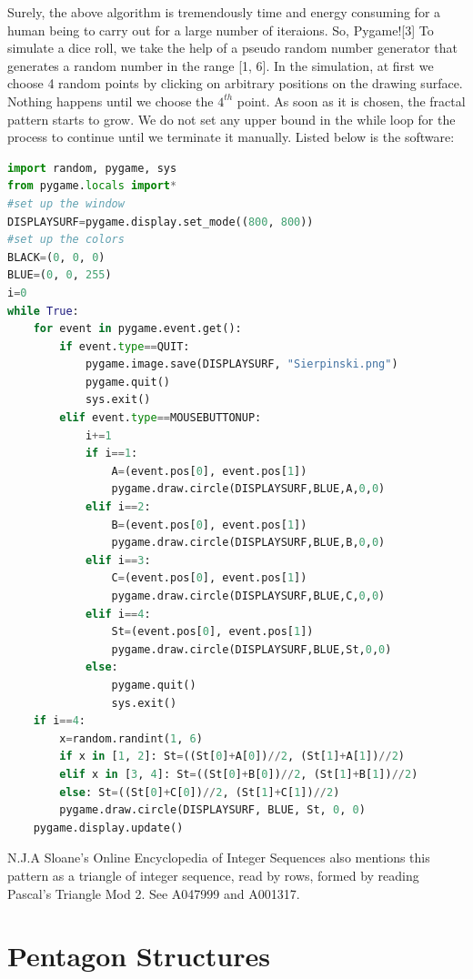 \documentclass{article}
\begin{document}
Surely, the above algorithm is tremendously time and energy consuming for a human being to carry out for a large number of iteraions. So, Pygame![3] To simulate a dice roll, we take the help of a pseudo random number generator that generates a random number in the range [1, 6]. In the simulation, at first we choose 4 random points by clicking on arbitrary positions on the drawing surface. Nothing happens until we choose the $4^{th}$ point. As soon as it is chosen, the fractal pattern starts to grow. We do not set any upper bound in the while loop for the process to continue until we terminate it manually. Listed below is the software:
\begin{lstlisting}[language=Python, frame=single]
import random, pygame, sys
from pygame.locals import*
#set up the window
DISPLAYSURF=pygame.display.set_mode((800, 800))
#set up the colors
BLACK=(0, 0, 0)
BLUE=(0, 0, 255)
i=0
while True:
    for event in pygame.event.get():
        if event.type==QUIT:
            pygame.image.save(DISPLAYSURF, "Sierpinski.png")
            pygame.quit()
            sys.exit()
        elif event.type==MOUSEBUTTONUP:
            i+=1
            if i==1:
                A=(event.pos[0], event.pos[1])
                pygame.draw.circle(DISPLAYSURF,BLUE,A,0,0)
            elif i==2:
                B=(event.pos[0], event.pos[1])
                pygame.draw.circle(DISPLAYSURF,BLUE,B,0,0)
            elif i==3:
                C=(event.pos[0], event.pos[1])
                pygame.draw.circle(DISPLAYSURF,BLUE,C,0,0)
            elif i==4:
                St=(event.pos[0], event.pos[1])
                pygame.draw.circle(DISPLAYSURF,BLUE,St,0,0)
            else:
                pygame.quit()
                sys.exit()
    if i==4:
        x=random.randint(1, 6)
        if x in [1, 2]: St=((St[0]+A[0])//2, (St[1]+A[1])//2)
        elif x in [3, 4]: St=((St[0]+B[0])//2, (St[1]+B[1])//2)
        else: St=((St[0]+C[0])//2, (St[1]+C[1])//2)
        pygame.draw.circle(DISPLAYSURF, BLUE, St, 0, 0)
    pygame.display.update()
\end{lstlisting}

N.J.A Sloane's Online Encyclopedia of Integer Sequences also mentions this pattern as a triangle of integer sequence, read by rows, formed by reading Pascal's Triangle Mod 2. See A047999 and A001317.

\section{Pentagon Structures}
\end{document}
